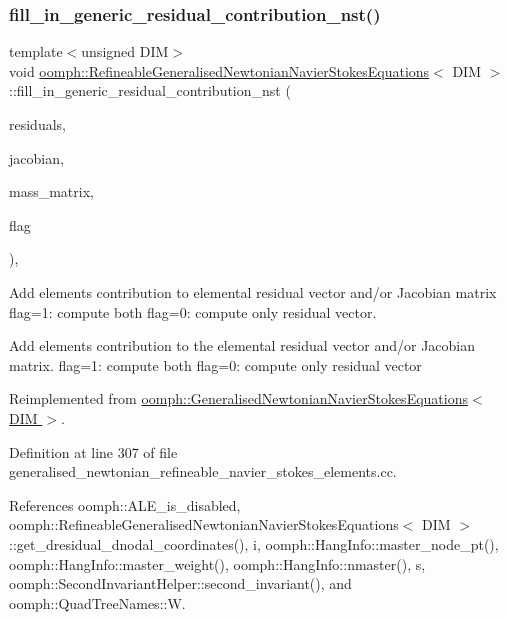 \subsubsection{\texorpdfstring{fill\+\_\+in\+\_\+generic\+\_\+residual\+\_\+contribution\+\_\+nst()}{fill\_in\_generic\_residual\_contribution\_nst()}}
{\footnotesize\ttfamily template$<$unsigned D\+IM$>$ \\
void \hyperlink{classoomph_1_1RefineableGeneralisedNewtonianNavierStokesEquations}{oomph\+::\+Refineable\+Generalised\+Newtonian\+Navier\+Stokes\+Equations}$<$ D\+IM $>$\+::fill\+\_\+in\+\_\+generic\+\_\+residual\+\_\+contribution\+\_\+nst (\begin{DoxyParamCaption}\item[{\hyperlink{classoomph_1_1Vector}{Vector}$<$ double $>$ \&}]{residuals,  }\item[{\hyperlink{classoomph_1_1DenseMatrix}{Dense\+Matrix}$<$ double $>$ \&}]{jacobian,  }\item[{\hyperlink{classoomph_1_1DenseMatrix}{Dense\+Matrix}$<$ double $>$ \&}]{mass\+\_\+matrix,  }\item[{unsigned}]{flag }\end{DoxyParamCaption})\hspace{0.3cm}{\ttfamily [protected]}, {\ttfamily [virtual]}}



Add element\textquotesingle{}s contribution to elemental residual vector and/or Jacobian matrix flag=1\+: compute both flag=0\+: compute only residual vector. 

Add element\textquotesingle{}s contribution to the elemental residual vector and/or Jacobian matrix. flag=1\+: compute both flag=0\+: compute only residual vector 

Reimplemented from \hyperlink{classoomph_1_1GeneralisedNewtonianNavierStokesEquations_a1f89df32ac0963374166d401a7de7b8f}{oomph\+::\+Generalised\+Newtonian\+Navier\+Stokes\+Equations$<$ D\+I\+M $>$}.



Definition at line 307 of file generalised\+\_\+newtonian\+\_\+refineable\+\_\+navier\+\_\+stokes\+\_\+elements.\+cc.



References oomph\+::\+A\+L\+E\+\_\+is\+\_\+disabled, oomph\+::\+Refineable\+Generalised\+Newtonian\+Navier\+Stokes\+Equations$<$ D\+I\+M $>$\+::get\+\_\+dresidual\+\_\+dnodal\+\_\+coordinates(), i, oomph\+::\+Hang\+Info\+::master\+\_\+node\+\_\+pt(), oomph\+::\+Hang\+Info\+::master\+\_\+weight(), oomph\+::\+Hang\+Info\+::nmaster(), s, oomph\+::\+Second\+Invariant\+Helper\+::second\+\_\+invariant(), and oomph\+::\+Quad\+Tree\+Names\+::W.



